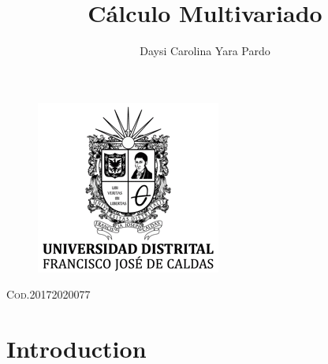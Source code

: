 \documentclass[11pt]{article}
\begin{document}
\centering
\oddsidemargin=-1cm
\textwidth=18cm
\topmargin=2cm
\textheight=20cm
\evensidemargin -6mm
\oddsidemargin -0.4cm
\textwidth 16.7cm
\textheight 24cm
\topmargin -0.65cm

\begin{figure}[t]
\centering
\graphicspath{ {Imag/} }
\includegraphics[scale=1, width=2.5 in]{Imag/logoUD.png}
\end{figure}

\title{Cálculo Multivariado}
\author{Daysi Carolina Yara Pardo}
\textsc{Cod.20172020077}

\maketitle
\newpage
\section{Introduction}
\end{document}
